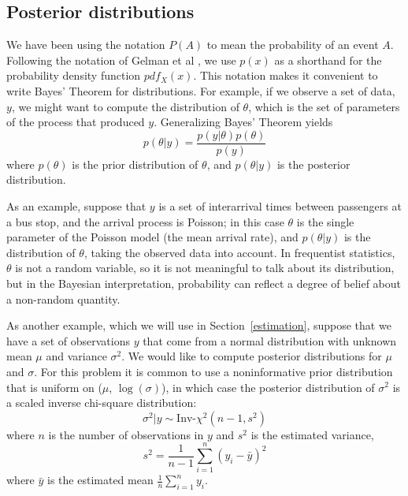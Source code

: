 \documentclass[twocolumn,11pt]{article}
\begin{document}
\subsection{Posterior distributions}

We have been using the notation $P(A)$ to mean the probability of an
event $A$.  Following the notation of Gelman et al
\cite{gelman03bayesian}, we use $p(x)$ as a shorthand for the
probability density function $pdf_X(x)$.  This notation makes it
convenient to write Bayes' Theorem for distributions.  For example,
if we observe a set of data, $y$, we might want to compute the
distribution of $\theta$, which is the set of parameters of the
process that produced $y$.  Generalizing Bayes' Theorem yields
%
\begin{equation}
p(\theta|y) = \frac{p(y|\theta) p(\theta)}{p(y)}
\end{equation}
%
where $p(\theta)$ is the prior distribution
of $\theta$, and $p(\theta|y)$ is the posterior distribution.

As an example, suppose that $y$ is a set of interarrival times between
passengers at a bus stop, and the arrival process is Poisson; in this
case $\theta$ is the single parameter of the Poisson model (the mean
arrival rate), and $p(\theta|y)$ is the distribution of $\theta$,
taking the observed data into account.  In frequentist statistics,
$\theta$ is not a random variable, so it is not meaningful to talk
about its distribution, but in the Bayesian interpretation,
probability can reflect a degree of belief about a non-random
quantity.

As another example, which we will use in Section~\ref{estimation},
suppose that we have a set of observations $y$ that come from a normal
distribution with unknown mean $\mu$ and variance $\sigma^2$.  We
would like to compute posterior distributions for $\mu$ and $\sigma$.
For this problem it is common to use a noninformative prior
distribution that is uniform on ($\mu$, $\log (\sigma)$), in which
case the posterior distribution of $\sigma^2$ is a scaled inverse
chi-square distribution:
%
\begin{equation}
\label{sigmapost}
\sigma^2|y \sim \mbox{Inv-} \chi ^2(n-1, s^2)
\end{equation}
%
where $n$ is the number of observations in $y$ and $s^2$ is
the estimated variance,
%
\begin{equation}
s^2 = \frac{1}{n-1} \sum_{i=1}^n (y_i - \bar{y})^2
\end{equation}
%
where $\bar{y}$ is the estimated mean $\frac{1}{n} \sum_{i=1}^n y_i$.
\end{document}
